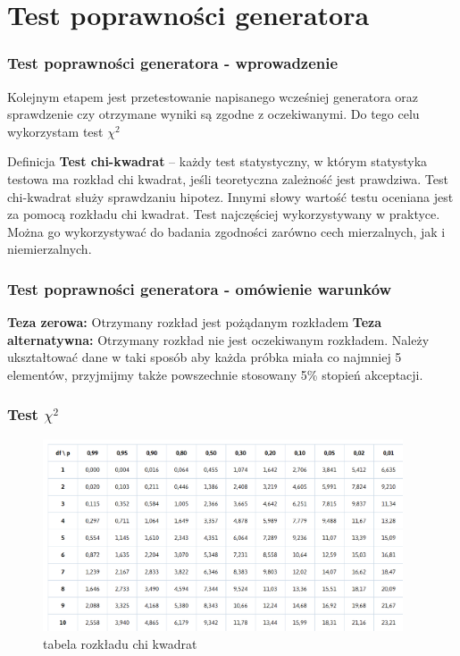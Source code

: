 \documentclass[9pt]{beamer}
\begin{document}
\section{Test poprawności generatora}
\begin{frame}
  \frametitle{Test poprawności generatora - wprowadzenie}
  Kolejnym etapem jest przetestowanie napisanego wcześniej generatora oraz sprawdzenie czy otrzymane wyniki są zgodne z oczekiwanymi. Do tego celu wykorzystam test $\chi^2$
  \begin{block}{Definicja}
    \textbf{Test chi-kwadrat} – każdy test statystyczny, w którym statystyka testowa ma rozkład chi kwadrat, jeśli teoretyczna zależność jest prawdziwa. Test chi-kwadrat służy sprawdzaniu hipotez. Innymi słowy wartość testu oceniana jest za pomocą rozkładu chi kwadrat. Test najczęściej wykorzystywany w praktyce. Można go wykorzystywać do badania zgodności zarówno cech mierzalnych, jak i niemierzalnych.
    \end{block}
\end{frame}
\begin{frame}
  \frametitle{Test poprawności generatora - omówienie warunków}
  \textbf{Teza zerowa:} Otrzymany rozkład jest pożądanym rozkładem \newline
  \textbf{Teza alternatywna:} Otrzymany rozkład nie jest oczekiwanym rozkładem. \newline
  Należy ukształtować dane w taki sposób aby każda próbka miała co najmniej 5 elementów, przyjmijmy także powszechnie stosowany 5\% stopień akceptacji.
\end{frame}
\begin{frame}
  \frametitle{Test $\chi^2$}
  \begin{figure}[h!]
    \centering
    \includegraphics[width=0.95\textwidth]{assets/chi.png}
      \caption{tabela rozkładu chi kwadrat}
  \end{figure}
\end{frame}
\end{document}
